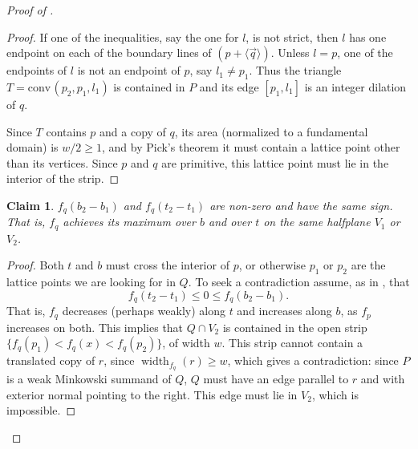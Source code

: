 \documentclass{amsart}
\theoremstyle{plain}
\newtheorem{claim}[theorem]{Claim}
\theoremstyle{definition}
\newcommand{\width}{\operatorname{width}}
\renewcommand{\vec}[1]{\overrightarrow#1}
\newcommand{\vecline}[1]{\langle \vec #1 \rangle}
\newcommand{\conv}{\ensuremath{\mathrm{conv}}\hspace{1pt}}
\begin{document}
\begin{proof}[Proof of ]
\begin{proof}
If one of the inequalities, say the one for $l$, is not strict, then $l$ has one endpoint on each of the boundary lines of $(p + \vecline q)$. Unless $l = p$, one of the endpoints of $l$ is not an endpoint of $p$, say $l_1 \neq p_1$. Thus the triangle $T=\conv(p_2, p_1, l_1)$ is contained in $P$ and its edge $[p_1, l_1]$ is an integer dilation of $q$. 

Since $T$ contains $p$ and a copy of $q$, its area (normalized to a fundamental domain) is $w/2 \geq 1$, and by Pick's theorem it must contain a lattice point other than its vertices. Since $p$ and $q$ are primitive, this lattice point must lie in the interior of the strip.
\end{proof}


\begin{claim}
\label{claim:b_and_t}
$f_q(b_2-b_1)$ and $f_q(t_2 - t_1)$ are non-zero and have the same sign. That is, $f_q$ achieves its maximum over $b$ and over $t$ on the same halfplane $V_1$ or $V_2$.
\end{claim}

\begin{proof}
Both $t$ and $b$ must cross the interior of $p$, or otherwise $p_1$ or $p_2$ are the lattice points we are looking for in $Q$.
To seek a contradiction assume, as in , that 
\[
f_q(t_2 - t_1) \le 0 \le f_q(b_2-b_1).
\]
That is, $f_q$ decreases (perhaps weakly) along $t$ and increases along $b$, as $f_p$ increases on both. This implies that $Q \cap V_2$ is contained in the open strip $\{f_q(p_1) <f_q(x)< f_q(p_2)\}$, of width $w$.
%
%
%
%
%
%
%
%
%
%	
This strip cannot contain a translated copy of $r$, since $\width_{f_q}(r) \geq w$, which gives a contradiction: since $P$ is a weak Minkowski summand of $Q$, $Q$ must have an edge parallel to $r$ and with exterior normal pointing to the right. This edge must lie in $V_2$, which is impossible.
\end{proof}


\end{proof}
\end{document}
